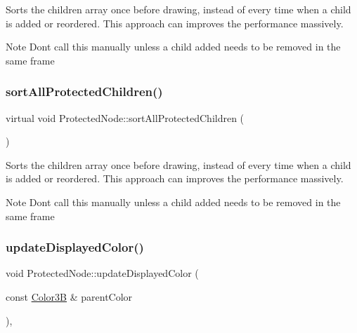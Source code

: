 Sorts the children array once before drawing, instead of every time when a child is added or reordered. This approach can improves the performance massively. \begin{DoxyNote}{Note}
Don\textquotesingle{}t call this manually unless a child added needs to be removed in the same frame 
\end{DoxyNote}
\mbox{\label{classProtectedNode_a6c714462d5e41ceda921eb39628056c1}} 
\subsubsection{\texorpdfstring{sort\+All\+Protected\+Children()}{sortAllProtectedChildren()}\hspace{0.1cm}{\footnotesize\ttfamily [2/2]}}
{\footnotesize\ttfamily virtual void Protected\+Node\+::sort\+All\+Protected\+Children (\begin{DoxyParamCaption}{ }\end{DoxyParamCaption})\hspace{0.3cm}{\ttfamily [virtual]}}

Sorts the children array once before drawing, instead of every time when a child is added or reordered. This approach can improves the performance massively. \begin{DoxyNote}{Note}
Don\textquotesingle{}t call this manually unless a child added needs to be removed in the same frame 
\end{DoxyNote}
\mbox{\label{classProtectedNode_a53b09aefb1db2c87f6ee6560b0c48430}} 
\subsubsection{\texorpdfstring{update\+Displayed\+Color()}{updateDisplayedColor()}\hspace{0.1cm}{\footnotesize\ttfamily [1/2]}}
{\footnotesize\ttfamily void Protected\+Node\+::update\+Displayed\+Color (\begin{DoxyParamCaption}\item[{const \hyperlink{structColor3B}{Color3B} \&}]{parent\+Color }\end{DoxyParamCaption})\hspace{0.3cm}{\ttfamily [override]}, {\ttfamily [virtual]}}

